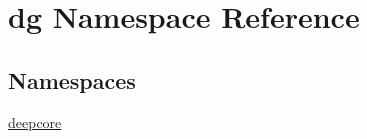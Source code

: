 \hypertarget{namespacedg}{}\section{dg Namespace Reference}
\label{namespacedg}
\subsection*{Namespaces}
\begin{DoxyCompactItemize}
\item 
 \hyperlink{namespacedg_1_1deepcore}{deepcore}
\end{DoxyCompactItemize}
